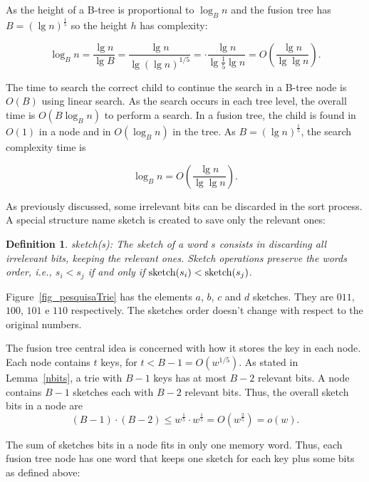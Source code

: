 \documentclass[11pt]{article}
\newtheorem{definicao}{Definition}
\newcommand{\sk}[1]{\mbox{\rm{sketch}}(#1)}
\begin{document}
As the height of a B-tree is proportional to $\log_B n $ and the fusion tree has $B = (\lg n)^\frac{1}{5}$ so the height $h$ has complexity:




\[ \log_B n = \frac{\lg n}{\lg B} = \frac{\lg n}{\lg (\lg n)^{1/5}} = \cdot \frac{\lg n}{\lg \frac{1}{5}\lg n} = O(\frac{\lg n}{\lg \lg n}). \]





The time to search the correct child to continue the search in a B-tree node is $O(B)$ using linear search. As the search occurs in each tree level, the overall time is  $O(B \log_B n)$ to perform a search. In a fusion tree, the child is found in 
$O(1)$ in a node and in $O(\log_B n)$ in the tree. As $B =(\lg n)^\frac{1}{5}$, the search complexity time is



\[  \log_B n = O(\dfrac{\lg n}{\lg \lg n}).\]









As previously discussed, some irrelevant bits can be discarded in the sort process. A special structure name sketch is created to save only the relevant ones:



\begin{definicao}{\sk{s}:}
The sketch of a word $s$ consists in discarding all irrelevant bits, keeping the relevant ones. Sketch operations preserve the words order, i.e., $s_i < s_j$ if and only if  $\sk{s_i} < \sk{s_j}$. 
\end{definicao}

Figure~\ref{fig_pesquisaTrie} has the elements $a$, $b$, $c$ and $d$ sketches. They are $011$, $100$, $101$ e $110$ respectively. The sketches order doesn't change with respect to the original numbers.




The fusion tree central idea is concerned with how it stores the key in each node. Each node contains $t$ keys, for $t < B-1 = O(w^{1/5})$. As stated in Lemma~\ref{nbits}, a trie with $B-1$ keys has at most $B-2$ relevant bits. A node contains $B-1$ sketches each with $B-2$ relevant bits. Thus, the overall sketch bits in a node are
$$ (B-1)\cdot (B-2) \leq w^\frac{1}{5} \cdot w^\frac{1}{5} = O(w^\frac{2}{5}) = o(w).$$

The sum of sketches bits in a node fits in only one memory word. Thus, each fusion tree node has one word that keeps one sketch for each key plus some bits as defined above:
\end{document}
